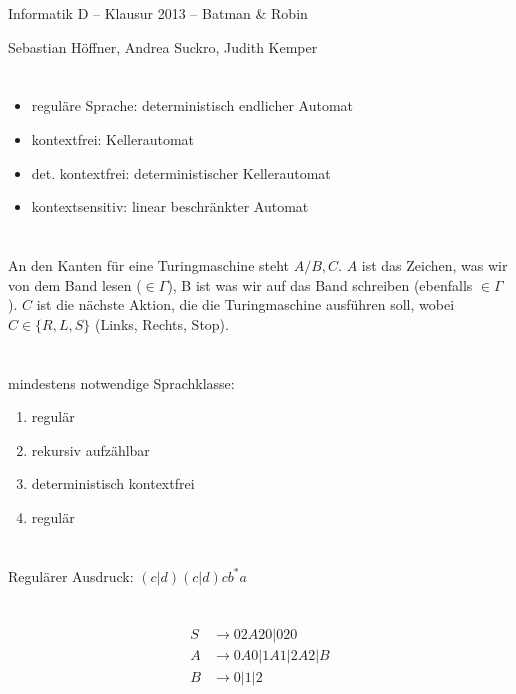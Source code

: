 \documentclass{article}
\begin{document}
\begin{center}
  \Large{Informatik D -- Klausur 2013 -- Batman \& Robin}

  \large{Sebastian Höffner, Andrea Suckro, Judith Kemper}
\end{center}

\section{}
\begin{itemize}
	\item reguläre Sprache: deterministisch endlicher Automat
  \item kontextfrei: Kellerautomat
  \item det. kontextfrei: deterministischer Kellerautomat
  \item kontextsensitiv: linear beschränkter Automat
\end{itemize}

\section{}
An den Kanten für eine Turingmaschine steht $A/B,C$. $A$ ist das Zeichen, was wir von dem Band lesen ($\in \Gamma$), B ist was wir auf das Band schreiben (ebenfalls $\in \Gamma$). $C$ ist die nächste Aktion, die die Turingmaschine ausführen soll, wobei $C \in \{R, L, S\}$ (Links, Rechts, Stop). 

\section{}
mindestens notwendige Sprachklasse:
\begin{enumerate}
	\item regulär
  \item rekursiv aufzählbar
  \item deterministisch kontextfrei
  \item regulär
\end{enumerate}

\section{}
Regulärer Ausdruck: $(c|d)(c|d)cb^*a$

\section{}
\begin{align*}
S&\rightarrow 02A20 | 020\\
A&\rightarrow 0A0 | 1A1 | 2A2 | B\\
B&\rightarrow 0|1|2
\end{align*}
\end{document}
